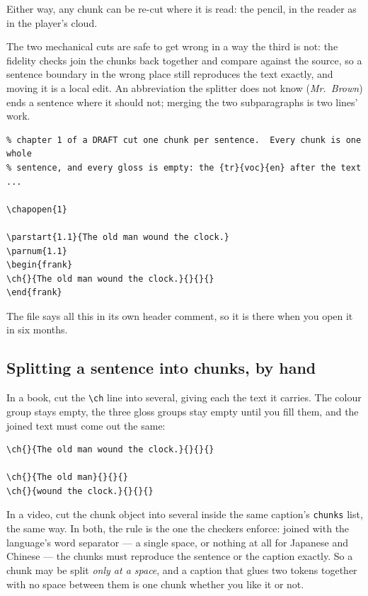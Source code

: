 \documentclass[11pt,oneside]{report}
\begin{document}
Either way, any chunk can be re-cut where it is read: the pencil, in the
reader as in the player's cloud.

The two mechanical cuts are safe to get wrong in a way the third is not: the
fidelity checks join the chunks back together and compare against the source,
so a sentence boundary in the wrong place still reproduces the text exactly,
and moving it is a local edit. An abbreviation the splitter does not know
(\emph{Mr.\ Brown}) ends a sentence where it should not; merging the two
subparagraphs is two lines' work.

\begin{lstlisting}
% chapter 1 of a DRAFT cut one chunk per sentence.  Every chunk is one whole
% sentence, and every gloss is empty: the {tr}{voc}{en} after the text ...

\chapopen{1}

\parstart{1.1}{The old man wound the clock.}
\parnum{1.1}
\begin{frank}
\ch{}{The old man wound the clock.}{}{}{}
\end{frank}
\end{lstlisting}

\noindent The file says all this in its own header comment, so it is there
when you open it in six months.

\subsection*{Splitting a sentence into chunks, by hand}

In a book, cut the \verb|\ch| line into several, giving each the text it
carries. The colour group stays empty, the three gloss groups stay empty until
you fill them, and the joined text must come out the same:

\begin{lstlisting}
\ch{}{The old man wound the clock.}{}{}{}

\ch{}{The old man}{}{}{}
\ch{}{wound the clock.}{}{}{}
\end{lstlisting}

\noindent In a video, cut the chunk object into several inside the same
caption's \texttt{chunks} list, the same way. In both, the rule is the one the
checkers enforce: joined with the language's word separator --- a single
space, or nothing at all for Japanese and Chinese --- the chunks must
reproduce the sentence or the caption exactly. So a chunk may be split
\emph{only at a space}, and a caption that glues two tokens together with no
space between them is one chunk whether you like it or not.
\end{document}
